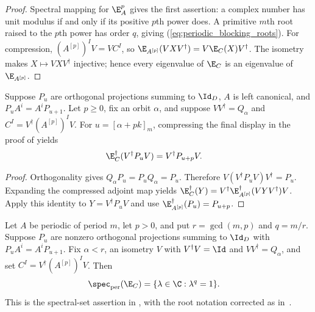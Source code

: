 \begin{proof}\leanok
    Spectral mapping for $\E_A^p$ gives the first assertion: a complex number
    has unit modulus if and only if its positive $p$th power does.
    A primitive $m$th root raised to the $p$th power has order $q$, giving
    (\ref{eq:periodic_blocking_roots}). For compression,
    $(A^{[p]})^IV=VC^I$, so
    $\E_{A^{[p]}}(VXV^\dagger)=V\E_C(X)V^\dagger$.
    The isometry makes $X\mapsto VXV^\dagger$ injective; hence every
    eigenvalue of $\E_C$ is an eigenvalue of $\E_{A^{[p]}}$.
\end{proof}

\begin{lemma}
    \label{thm:periodic_compressed_projection_shift}
    \leanok
    Suppose $P_u$ are orthogonal projections summing to $\Id_D$, $A$ is
    left canonical, and $P_uA^i=A^iP_{u+1}$. Let $p\ge0$, fix an orbit
    $\alpha$, and suppose $VV^\dagger=Q_\alpha$ and
    $C^I=V^\dagger(A^{[p]})^IV$. For $u=[\alpha+pk]_m$, compressing the final
    display in the proof of \cite[Lemma~6]{DeLasCuevas2017Irreducible} yields
    \begin{align}
        \E_C^\dagger(V^\dagger P_uV) & =V^\dagger P_{u+p}V.
        \label{eq:periodic_compressed_projection_shift}
    \end{align}
\end{lemma}

\begin{proof}\leanok
    Orthogonality gives $Q_\alpha P_u=P_uQ_\alpha=P_u$. Therefore
    $V(V^\dagger P_uV)V^\dagger=P_u$. Expanding the compressed adjoint map
    yields $\E_C^\dagger(Y)=V^\dagger\E_{A^{[p]}}^\dagger(VYV^\dagger)V$.
    Apply this identity to $Y=V^\dagger P_uV$ and use
    $\E_{A^{[p]}}^\dagger(P_u)=P_{u+p}$.
\end{proof}

\begin{lemma}
    \label{thm:periodic_compressed_exact_spectrum}
    \leanok
    Let $A$ be periodic of period $m$, let $p>0$, and put
    $r=\gcd(m,p)$ and $q=m/r$. Suppose $P_u$ are nonzero orthogonal
    projections summing to $\Id_D$ with $P_uA^i=A^iP_{u+1}$.
    Fix $\alpha<r$, an isometry $V$ with $V^\dagger V=\Id$
    and $VV^\dagger=Q_\alpha$, and set
    $C^I=V^\dagger(A^{[p]})^IV$. Then
    \begin{align}
        \spec_{\mathrm{per}}(\E_C)
         & =\{\lambda\in\C:\lambda^q=1\}.
        \label{eq:periodic_compressed_exact_spectrum}
    \end{align}
    This is the spectral-set assertion in
    \cite[Lemma~6]{DeLasCuevas2017Irreducible}, with the root notation
    corrected as in~\cite{gap:dccsp17_blocking_peripheral_roots}.
\end{lemma}


